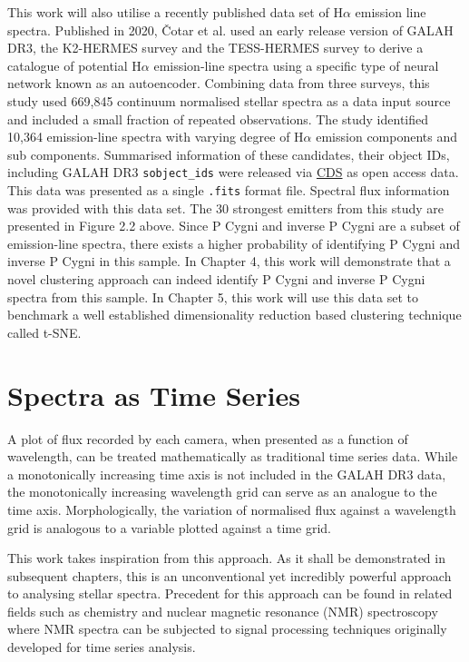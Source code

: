 This work will also utilise a recently published data set of H$\alpha$ emission line spectra. Published in 2020, Čotar et al. used an early release version of GALAH DR3\cite{de2015galah}, the K2-HERMES survey\cite{wittenmyer2018k2} and the TESS-HERMES survey\cite{sharma2018tess} to derive a catalogue of potential H$\alpha$ emission-line spectra using a specific type of neural network known as an autoencoder. Combining data from three surveys, this study used 669,845 continuum normalised stellar spectra as a data input source and included a small fraction of repeated observations. The study identified 10,364 emission-line spectra with varying degree of H$\alpha$ emission components and sub components. Summarised information of these candidates, their object IDs, including GALAH DR3 \texttt{sobject\_ids} were released via \href{https://cdsweb.u-strasbg.fr/}{CDS} as open access data. This data was presented as a single \texttt{.fits} format file. Spectral flux information was provided with this data set. The 30 strongest emitters from this study are presented in Figure 2.2 above. Since P Cygni and inverse P Cygni are a subset of emission-line spectra, there exists a higher probability of identifying P Cygni and inverse P Cygni in this sample. In Chapter 4, this work will demonstrate that a novel clustering approach can indeed identify P Cygni and inverse P Cygni spectra from this sample. In Chapter 5, this work will use this data set to benchmark a well established dimensionality reduction based clustering technique called t-SNE.

\section{Spectra as Time Series}

A plot of flux recorded by each camera, when presented as a function of wavelength, can be treated mathematically as traditional time series data. While a monotonically increasing time axis is not included in the GALAH DR3 data, the monotonically increasing wavelength grid can serve as an analogue to the time axis. Morphologically, the variation of normalised flux against a wavelength grid is analogous to a variable plotted against a time grid.

This work takes inspiration from this approach. As it shall be demonstrated in subsequent chapters, this is an unconventional yet incredibly powerful approach to analysing stellar spectra. Precedent for this approach can be found in related fields such as chemistry and nuclear magnetic resonance (NMR) spectroscopy where NMR spectra can be subjected to signal processing techniques originally developed for time series analysis\cite{nielsen2019practical}.

